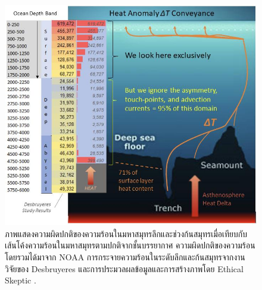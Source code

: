 \documentclass[10pt,twocolumn,letterpaper]{article}
\begin{document}
\begin{figure}[t]
\begin{center}
\includegraphics[width=1\textwidth]{deepsea.jpg}
\end{center}
   \caption{ภาพแสดงความผิดปกติของความร้อนในมหาสมุทรลึกและช่วงก้นสมุทรเมื่อเทียบกับเส้นโค้งความร้อนในมหาสมุทรตามปกติจากชั้นบรรยากาศ ความผิดปกติของความร้อนโดยรวมได้มาจาก NOAA \cite{147} การกระจายความร้อนในระดับลึกและก้นสมุทรจากงานวิจัยของ Desbruyeres \cite{132} และการประมวลผลข้อมูลและการสร้างภาพโดย Ethical Skeptic \cite{129}.}
\label{fig:21}
\end{figure}
\end{document}

